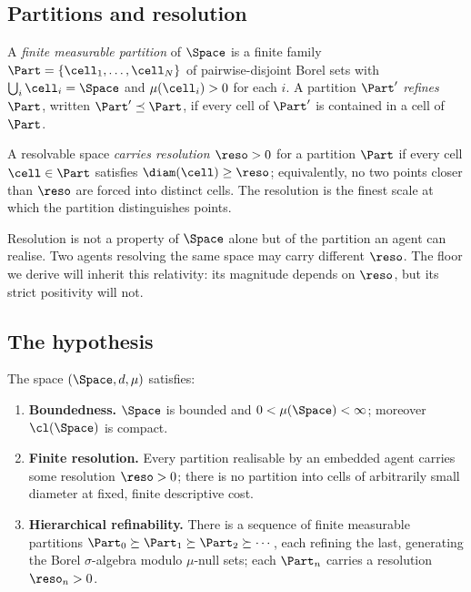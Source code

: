 \subsection{Partitions and resolution}

\begin{definition}
\label{def:partition}
A \emph{finite measurable partition} of $\Space$ is a finite family
$\Part=\{\cell_1,\dots,\cell_N\}$ of pairwise-disjoint Borel sets with
$\bigcup_i\cell_i=\Space$ and $\mu(\cell_i)>0$ for each $i$. A partition
$\Part'$ \emph{refines} $\Part$, written $\Part'\preceq\Part$, if every cell of
$\Part'$ is contained in a cell of $\Part$.
\end{definition}

\begin{definition}[Resolution]
\label{def:resolution}
A resolvable space \emph{carries resolution $\reso>0$} for a partition $\Part$
if every cell $\cell\in\Part$ satisfies $\diam(\cell)\ge\reso$; equivalently, no
two points closer than $\reso$ are forced into distinct cells. The resolution
is the finest scale at which the partition distinguishes points.
\end{definition}

\begin{remark}
\label{rem:reso-relative}
Resolution is not a property of $\Space$ alone but of the partition an agent can
realise. Two agents resolving the same space may carry different $\reso$. The
floor we derive will inherit this relativity: its magnitude depends on $\reso$,
but its strict positivity will not.
\end{remark}

\subsection{The hypothesis}

\begin{axiom}
\label{ax:brs}
The space $(\Space,d,\mu)$ satisfies:
\begin{enumerate}[label=\textup{(BRS\arabic*)},leftmargin=3.2em]
\item\label{brs:bdd} \textbf{Boundedness.} $\Space$ is bounded and
$0<\mu(\Space)<\infty$; moreover $\cl(\Space)$ is compact.
\item\label{brs:res} \textbf{Finite resolution.} Every partition realisable by
an embedded agent carries some resolution $\reso>0$; there is no partition into
cells of arbitrarily small diameter at fixed, finite descriptive cost.
\item\label{brs:hier} \textbf{Hierarchical refinability.} There is a sequence of
finite measurable partitions $\Part_0\succeq\Part_1\succeq\Part_2\succeq\cdots$,
each refining the last, generating the Borel $\sigma$-algebra modulo $\mu$-null
sets; each $\Part_n$ carries a resolution $\reso_n>0$.
\end{enumerate}
\end{axiom}

